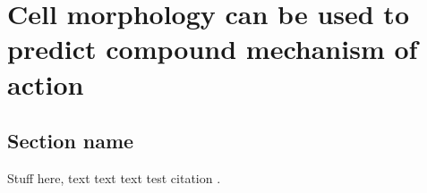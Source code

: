 \documentclass[a4paper,11pt,twoside,openright]{scrbook}
\begin{document}
\chapter{Cell morphology can be used to predict compound mechanism of action} \label{chapter:moa}

\section{Section name}
Stuff here, text text text test citation \cite{Yang2018}.




\end{document}
